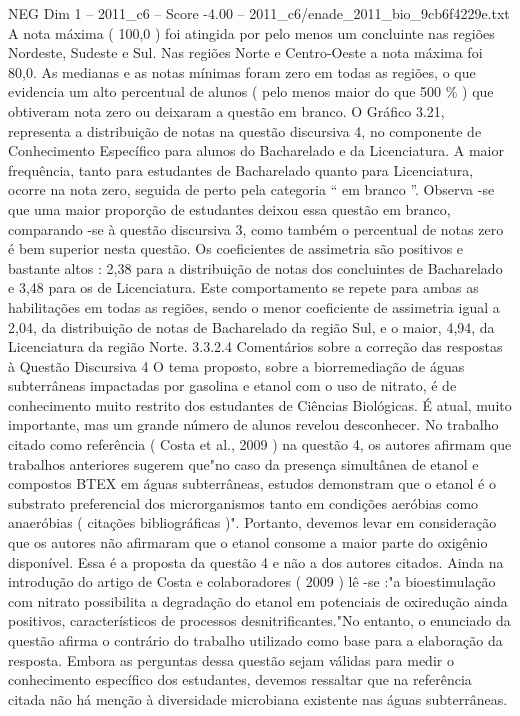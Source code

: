 \begin{textsample}{NEG Dim 1 – 2011\_c6 – Score -4.00 – 2011\_c6/enade\_2011\_bio\_9cb6f4229e.txt}
A nota máxima ( 100,0 ) foi atingida por pelo menos um concluinte nas regiões Nordeste, Sudeste e Sul.
Nas regiões Norte e Centro-Oeste a nota máxima foi 80,0.
As medianas e as notas mínimas foram zero em todas as regiões, o que evidencia um alto percentual de alunos ( pelo menos maior do que 500 \% ) que obtiveram nota zero ou deixaram a questão em branco.
O Gráfico 3.21, representa a distribuição de notas na questão discursiva 4, no componente de Conhecimento Específico para alunos do Bacharelado e da Licenciatura.
A maior frequência, tanto para estudantes de Bacharelado quanto para Licenciatura, ocorre na nota zero, seguida de perto pela categoria “ em branco ”.
Observa -se que uma maior proporção de estudantes deixou essa questão em branco, comparando -se à questão discursiva 3, como também o percentual de notas zero é bem superior nesta questão.
Os coeficientes de assimetria são positivos e bastante altos : 2,38 para a distribuição de notas dos concluintes de Bacharelado e 3,48 para os de Licenciatura.
Este comportamento se repete para ambas as habilitações em todas as regiões, sendo o menor coeficiente de assimetria igual a 2,04, da distribuição de notas de Bacharelado da região Sul, e o maior, 4,94, da Licenciatura da região Norte. 3.3.2.4 Comentários sobre a correção das respostas à Questão Discursiva 4 O tema proposto, sobre a biorremediação de águas subterrâneas impactadas por gasolina e etanol com o uso de nitrato, é de conhecimento muito restrito dos estudantes de Ciências Biológicas.
É atual, muito importante, mas um grande número de alunos revelou desconhecer.
No trabalho citado como referência ( Costa et al., 2009 ) na questão 4, os autores afirmam que trabalhos anteriores sugerem que"no caso da presença simultânea de etanol e compostos BTEX em águas subterrâneas, estudos demonstram que o etanol é o substrato preferencial dos microrganismos tanto em condições aeróbias como anaeróbias ( citações bibliográficas )".
Portanto, devemos levar em consideração que os autores não afirmaram que o etanol consome a maior parte do oxigênio disponível.
Essa é a proposta da questão 4 e não a dos autores citados.
Ainda na introdução do artigo de Costa e colaboradores ( 2009 ) lê -se :"a bioestimulação com nitrato possibilita a degradação do etanol em potenciais de oxiredução ainda positivos, característicos de processos desnitrificantes."No entanto, o enunciado da questão afirma o contrário do trabalho utilizado como base para a elaboração da resposta.
Embora as perguntas dessa questão sejam válidas para medir o conhecimento específico dos estudantes, devemos ressaltar que na referência citada não há menção à diversidade microbiana existente nas águas subterrâneas.

\end{textsample}
